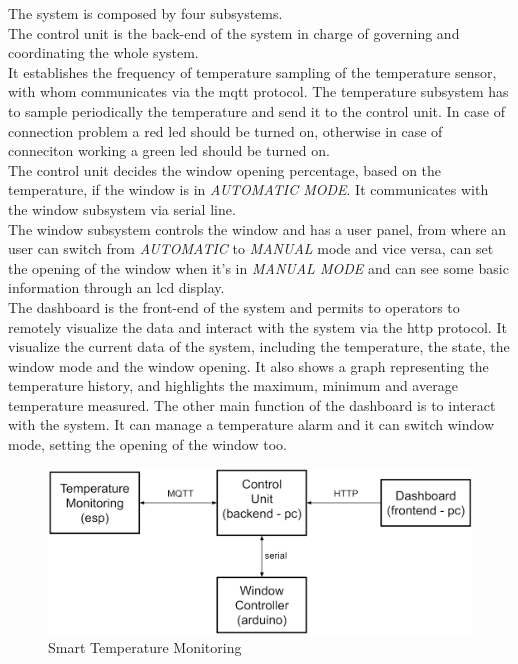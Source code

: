 \documentclass[a4paper,12pt]{report}
\begin{document}
        The system is composed by four subsystems.\\
        The control unit is the back-end of the system in charge of governing and coordinating the whole system.\\
        It establishes the frequency of temperature sampling of the temperature sensor, with whom communicates via the mqtt protocol. 
        The temperature subsystem has to sample periodically the temperature and send it to the control unit. In case of connection problem a red led should be turned on, otherwise in case of conneciton working a green led should be turned on.\\
        The control unit decides the window opening percentage, based on the temperature, if the window is in \textit{AUTOMATIC MODE}. It communicates with the window subsystem via serial line. \\
        The window subsystem controls the window and has a user panel, from where an user can switch from \textit{AUTOMATIC} to \textit{MANUAL} mode and vice versa, can set the opening of the window when it's in \textit{MANUAL MODE} and can see some basic information through an lcd display.\\
        The dashboard is the front-end of the system and permits to operators to remotely visualize the data and interact with the system via the http protocol. 
        It visualize the current data of the system, including the temperature, the state, the window mode and the window opening.
        It also shows a graph representing the temperature history, and highlights the maximum, minimum and average temperature measured.
        The other main function of the dashboard is to interact with the system. It can manage a temperature alarm and it can switch window mode, setting the opening of the window too.

        \begin{figure}[H]
            \centering{}
            \includegraphics[width=350pt]{report/img/Assignment-03_SMT-Domain.png}
            \caption{Smart Temperature Monitoring}
            \label{img:system}
        \end{figure}
\end{document}
